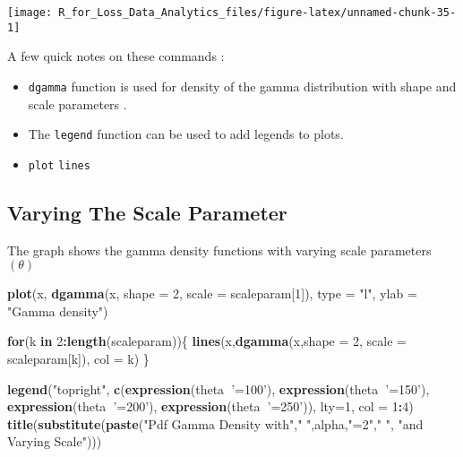 \documentclass[]{book}
\newenvironment{Shaded}{\begin{snugshade}}{\end{snugshade}}
\newcommand{\KeywordTok}[1]{\textcolor[rgb]{0.13,0.29,0.53}{\textbf{#1}}}
\newcommand{\DataTypeTok}[1]{\textcolor[rgb]{0.13,0.29,0.53}{#1}}
\newcommand{\DecValTok}[1]{\textcolor[rgb]{0.00,0.00,0.81}{#1}}
\newcommand{\StringTok}[1]{\textcolor[rgb]{0.31,0.60,0.02}{#1}}
\newcommand{\ControlFlowTok}[1]{\textcolor[rgb]{0.13,0.29,0.53}{\textbf{#1}}}
\newcommand{\OperatorTok}[1]{\textcolor[rgb]{0.81,0.36,0.00}{\textbf{#1}}}
\newcommand{\NormalTok}[1]{#1}
\theoremstyle{definition}
\theoremstyle{definition}
\theoremstyle{definition}
\theoremstyle{remark}
\begin{document}
\begin{center}\texttt{[image: R\_for\_Loss\_Data\_Analytics\_files/figure-latex/unnamed-chunk-35-1]} \end{center}

A few quick notes on these commands :

\begin{itemize}
\item
  \texttt{dgamma} function is used for density of the gamma distribution
  with shape and scale parameters .
\item
  The \texttt{legend} function can be used to add legends to plots.
\item
  \texttt{plot} \texttt{lines}
\end{itemize}

\subsection{Varying The Scale
Parameter}\label{varying-the-scale-parameter}

The graph shows the gamma density functions with varying scale
parameters \((\theta)\)

\begin{Shaded}
\begin{Highlighting}[]
\KeywordTok{plot}\NormalTok{(x, }\KeywordTok{dgamma}\NormalTok{(x, }\DataTypeTok{shape =} \DecValTok{2}\NormalTok{, }\DataTypeTok{scale =}\NormalTok{ scaleparam[}\DecValTok{1}\NormalTok{]), }\DataTypeTok{type =} \StringTok{"l"}\NormalTok{, }\DataTypeTok{ylab =} \StringTok{"Gamma density"}\NormalTok{)}

\ControlFlowTok{for}\NormalTok{(k }\ControlFlowTok{in} \DecValTok{2}\OperatorTok{:}\KeywordTok{length}\NormalTok{(scaleparam))\{}
  \KeywordTok{lines}\NormalTok{(x,}\KeywordTok{dgamma}\NormalTok{(x,}\DataTypeTok{shape =} \DecValTok{2}\NormalTok{, }\DataTypeTok{scale =}\NormalTok{ scaleparam[k]), }\DataTypeTok{col =}\NormalTok{ k)}
\NormalTok{\}}

\KeywordTok{legend}\NormalTok{(}\StringTok{"topright"}\NormalTok{, }\KeywordTok{c}\NormalTok{(}\KeywordTok{expression}\NormalTok{(theta}\OperatorTok{~}\StringTok{'=100'}\NormalTok{), }\KeywordTok{expression}\NormalTok{(theta}\OperatorTok{~}\StringTok{'=150'}\NormalTok{), }\KeywordTok{expression}\NormalTok{(theta}\OperatorTok{~}\StringTok{'=200'}\NormalTok{), }\KeywordTok{expression}\NormalTok{(theta}\OperatorTok{~}\StringTok{'=250'}\NormalTok{)), }\DataTypeTok{lty=}\DecValTok{1}\NormalTok{, }\DataTypeTok{col =} \DecValTok{1}\OperatorTok{:}\DecValTok{4}\NormalTok{)}
\KeywordTok{title}\NormalTok{(}\KeywordTok{substitute}\NormalTok{(}\KeywordTok{paste}\NormalTok{(}\StringTok{"Pdf Gamma Density with"}\NormalTok{,}\StringTok{" "}\NormalTok{,alpha,}\StringTok{"=2"}\NormalTok{,}\StringTok{" "}\NormalTok{, }\StringTok{"and Varying Scale"}\NormalTok{)))}
\end{Highlighting}
\end{Shaded}
\end{document}
